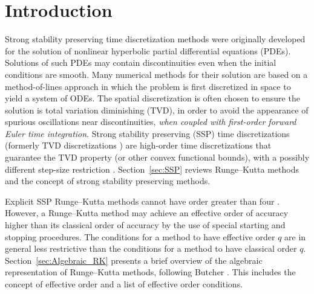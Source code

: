 \section{Introduction}\label{sec:Intro}
Strong stability preserving time discretization methods were originally
developed for the solution of nonlinear hyperbolic 
partial differential equations (PDEs).  Solutions of such PDEs may 
contain discontinuities even when the initial conditions are smooth.
Many numerical methods for their solution are based on a method-of-lines approach 
in which the problem is first discretized in space to yield a system of ODEs. 
The spatial discretization is often chosen to ensure the solution is total variation diminishing (TVD),
in order to avoid the appearance of spurious oscillations near discontinuities,
\emph{when coupled with first-order forward Euler time integration}.
Strong stability preserving (SSP) time discretizations (formerly TVD
discretizations \cite{Gottlieb/Shu:1998}) are high-order time
discretizations that guarantee the TVD property (or other convex functional bounds), with a
possibly different step-size restriction \cite{Gottlieb2011a}.
Section~\ref{sec:SSP} reviews Runge--Kutta methods and the concept of
strong stability preserving methods.

Explicit SSP Runge--Kutta methods cannot have order greater
than four \cite{Ruuth2002}.  However, a Runge--Kutta method may 
achieve an effective order of accuracy higher than its classical order of accuracy
by the use of special starting and stopping procedures.
The conditions for a method to have effective order $q$ are 
in general less restrictive than the conditions for a method
to have classical order $q$.
Section~\ref{sec:Algebraic_RK} presents a brief overview of the
algebraic representation of Runge--Kutta methods, following Butcher
\cite{Butcher2008_book}.
This includes the concept of effective order and a list of effective
order conditions.

